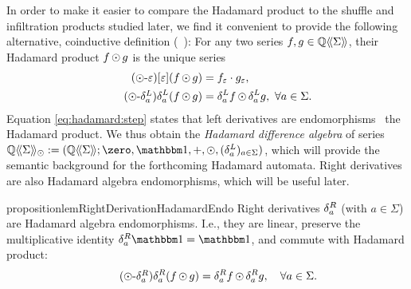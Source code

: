 In order to make it easier to compare the Hadamard product
to the shuffle and infiltration products studied later,
we find it convenient to provide the following alternative,
coinductive definition
(\cf~\cite[Definition 8.1]{BasoldHansenPinRutten:MSCS:2017}):
%
For any two series $f, g \in \mathbb Q\langle\!\langle\Sigma\rangle\!\rangle$,
their Hadamard product $f \operatorname{\odot} g$
is the unique series \st
%
\begin{align}
    \tag{${\hadamard}$-$\e$}
    \label{eq:hadamard:base}
    \coefficient \e {(f \hadamard g)}
        &= f_\e \cdot g_\e, \\
    \tag{${\hadamard}$-$\deriveleft a$}
    \label{eq:hadamard:step}
        \deriveleft a (f \hadamard g)
        &= \deriveleft a f \hadamard \deriveleft a g,
        \ \forall a \in \Sigma.
\end{align}
%
%
Equation \cref{eq:hadamard:step} states that left derivatives are endomorphisms \wrt~the Hadamard product.
%
We thus obtain the \emph{Hadamard difference algebra} of series
    $\series \Q \Sigma_{\hadamard} := \tuple{\series \Q \Sigma; \zero, \one, {+}, {\hadamard}, (\deriveleft a)_{a \in \Sigma}}$,
which will provide the semantic background
for the forthcoming Hadamard automata.
%
Right derivatives are also Hadamard algebra endomorphisms,
which will be useful later.
%
\begin{restatable}{proposition}{lemRightDerivationHadamardEndo}
    \label{lem:right derivation Hadamard endomorphism}
    Right derivatives $\delta^R_{a}$ (with $a \in \Sigma$) are Hadamard algebra endomorphisms.
    I.e., they are linear, preserve the multiplicative identity $\deriveright a \one = \one$,
    and commute with Hadamard product:
    \begin{align}
        \tag{${\hadamard}$-$\deriveright a$}
        \label{eq:derive hadamard right}
        \deriveright a (f \hadamard g) = \deriveright a f \hadamard \deriveright a g,
        \quad\forall a \in \Sigma.
    \end{align}
\end{restatable}
%

